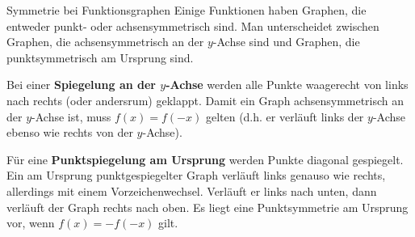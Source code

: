 \documentclass[../../main.tex]{subfiles}
\begin{document}
\begin{nutshell}{Symmetrie bei Funktionsgraphen}
    Einige Funktionen haben Graphen, die entweder punkt- oder achsensymmetrisch sind. Man unterscheidet zwischen Graphen, die achsensymmetrisch an der $y$-Achse sind und Graphen, die punktsymmetrisch am Ursprung sind.
    
    Bei einer \textbf{Spiegelung an der $y$-Achse} werden alle Punkte waagerecht von links nach rechts (oder andersrum) geklappt. Damit ein Graph achsensymmetrisch an der $y$-Achse ist, muss $f(x)=f(-x)$ gelten (d.h. er verläuft links der $y$-Achse ebenso wie rechts von der $y$-Achse).
    
    Für eine \textbf{Punktspiegelung am Ursprung} werden Punkte diagonal gespiegelt. Ein am Ursprung punktgespiegelter Graph verläuft links genauso wie rechts, allerdings mit einem Vorzeichenwechsel. Verläuft er links nach unten, dann verläuft der Graph rechts nach oben. Es liegt eine Punktsymmetrie am Ursprung vor, wenn $f(x)=-f(-x)$ gilt.
\end{nutshell}
\end{document}
